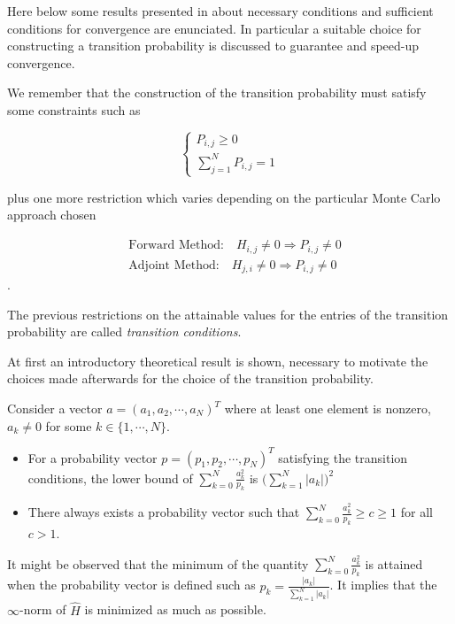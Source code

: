 Here below some results presented in
\cite{MASC2013} about necessary conditions and sufficient
conditions for
convergence are enunciated. In particular a suitable choice for constructing a
transition probability is discussed to guarantee and speed-up convergence.

We remember that the construction of the transition probability must satisfy
some constraints such as

\[
\begin{cases}
  P_{i,j}\ge 0 \\
 \sum_{j=1}^N P_{i,j}=1
\end{cases}
\]

plus one more restriction which varies depending on the particular Monte Carlo
approach chosen

\begin{align*}
& \text{Forward Method:} \quad H_{i,j}\ne 0 \Rightarrow P_{i,j}\ne 0 \\ &
\text{Adjoint Method:} \quad H_{j,i}\ne 0 \Rightarrow P_{i,j}\ne 0
\end{align*}.

The previous restrictions on the attainable values for the entries of the
transition probability are called \textit{transition conditions}.


At first an introductory theoretical result is shown, necessary to motivate the
choices made afterwards for the choice of the transition probability.

\begin{thm}
 Consider a vector $a=(a_1,a_2,\cdots,a_N)^T$ where at least one element is
nonzero, $a_k\ne0$ for some $k\in\{1,\cdots,N\}$.
\begin{itemize}
 \item For a probability vector $p=(p_1,p_2,\cdots,p_N)^T$ satisfying the
transition conditions, the lower bound of $\displaystyle
\sum_{k=0}^N\frac{a_k^2}{p_k}$ is $\bigg(\sum_{k=1}^N \lvert a_k\rvert\bigg)^2$
\item There always exists a probability vector such that $\displaystyle
\sum_{k=0}^N\frac{a_k^2}{p_k}\ge c\ge 1$ for all $c>1$.
\end{itemize}
\label{lemma}
\end{thm}

It might be observed that the minimum of the quantity $\displaystyle
\sum_{k=0}^N\frac{a_k^2}{p_k}$ is attained when the probability vector is
defined such as $\displaystyle p_k=\frac{\lvert a_k\rvert}{\sum_{k=1}^N \lvert
a_k\rvert}$. It implies that the $\infty$-norm of $\hat{H}$ is minimized as
much
as possible. \newline

